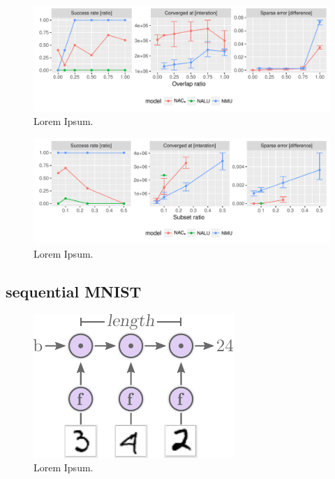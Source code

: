 \begin{figure}[H]
\centering
\includegraphics[width=\linewidth]{results/simple_function_static_overlap.pdf}
\caption{Lorem Ipsum.}
\end{figure}

\begin{figure}[H]
\centering
\includegraphics[width=\linewidth]{results/simple_function_static_subset.pdf}
\caption{Lorem Ipsum.}
\end{figure}

\subsection{sequential MNIST}

\begin{figure}[H]
\centering
\includegraphics[scale=1]{graphics/mnist_sequence_problem.pdf}
\caption{Lorem Ipsum.}
\end{figure}

